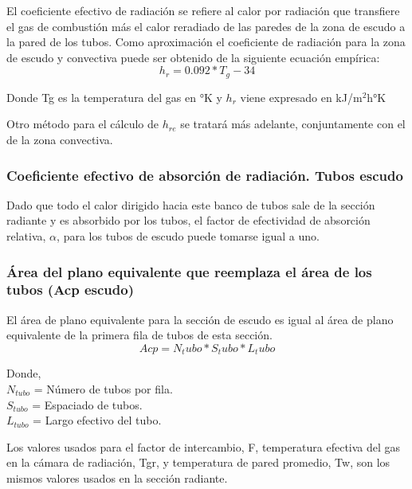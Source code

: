 \par El coeficiente efectivo de radiación se refiere al calor por radiación que transfiere el gas de combustión más el calor reradiado de las paredes de la zona de escudo a la pared de los tubos. Como aproximación el coeficiente de radiación para la zona de escudo y convectiva puede ser obtenido de la siguiente ecuación empírica:
\begin{equation}
\label{eq:hr}
h_r = 0.092*T_g - 34  
\end{equation}
\par Donde Tg es la temperatura del gas en °K y $h_r$ viene expresado en kJ/m$^2$h°K

\par Otro método para el cálculo de $h_{re}$ se tratará más adelante, conjuntamente con el de la zona convectiva.

\subsubsection{Coeficiente efectivo de absorción de radiación. Tubos escudo}
\par Dado que todo el calor dirigido hacia este banco de tubos sale de la sección radiante y es absorbido por los tubos, el factor de efectividad de absorción relativa, $\alpha$, para los tubos de escudo puede tomarse igual a uno.

\subsubsection{Área del plano equivalente que reemplaza el área de los tubos (Acp escudo)}
\par El área de plano equivalente para la sección de escudo es igual al área de plano equivalente de la primera fila de tubos de esta sección.
\begin{equation*}
Acp = N_tubo * S_tubo * L_tubo
\end{equation*}
\par Donde, \\
$N_{tubo}$ = Número de tubos por fila. \\
$S_{tubo}$ = Espaciado de tubos. \\
$L_{tubo}$ = Largo efectivo del tubo.\\
\par Los valores usados para el factor de intercambio, F, temperatura efectiva del gas en la cámara de radiación, Tgr, y temperatura de pared promedio, Tw, son los mismos valores usados en la sección radiante.

